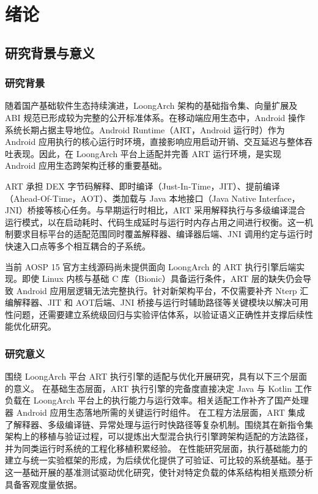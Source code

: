 \chapter{绪论}\label{chap:introduction}

\section{研究背景与意义}

\subsection{研究背景}

随着国产基础软件生态持续演进，LoongArch 架构的基础指令集、向量扩展及 ABI 规范已形成较为完整的公开标准体系\citep{LoongArchISA2023, LoongArchISAv2, LoongArchELFABI2025}。在移动端应用生态中，Android 操作系统长期占据主导地位\citep{StatCounter2025}。Android Runtime（ART，Android 运行时）作为 Android 应用执行的核心运行时环境，直接影响应用启动开销、交互延迟与整体吞吐表现。因此，在 LoongArch 平台上适配并完善 ART 运行环境，是实现 Android 应用生态跨架构迁移的重要基础。

ART 承担 DEX 字节码解释、即时编译（Just-In-Time，JIT）、提前编译（Ahead-Of-Time，AOT）、类加载与 Java 本地接口（Java Native Interface，JNI）桥接等核心任务\citep{AndroidRuntime2024, ArtJitCompiler2024, AospArtAndroid15R1}。与早期运行时相比，ART 采用解释执行与多级编译混合运行模式，以在启动耗时、代码生成延时与运行时内存占用之间进行权衡\citep{Paleczny2001, Suganuma2001}。这一机制要求目标平台的适配范围同时覆盖解释器、编译器后端、JNI 调用约定与运行时快速入口点等多个相互耦合的子系统。

当前 AOSP 15 官方主线源码尚未提供面向 LoongArch 的 ART 执行引擎后端实现\citep{AospArtAndroid15R1, AospArtMain2026}。即使 Linux 内核与基础 C 库（Bionic）具备运行条件，ART 层的缺失仍会导致 Android 应用层逻辑无法完整执行。针对新架构平台，不仅需要补齐 Nterp 汇编解释器、JIT 和 AOT后端、JNI 桥接与运行时辅助路径等关键模块以解决可用性问题，还需要建立系统级回归与实验评估体系，以验证语义正确性并支撑后续性能优化研究。

\subsection{研究意义}

围绕 LoongArch 平台 ART 执行引擎的适配与优化开展研究，具有以下三个层面的意义。
在基础生态层面，ART 执行引擎的完备度直接决定 Java 与 Kotlin 工作负载在 LoongArch 平台上的执行能力与运行效率。相关适配工作补齐了国产处理器 Android 应用生态落地所需的关键运行时组件。
在工程方法层面，ART 集成了解释器、多级编译链、异常处理与运行时快路径等复杂机制。围绕其在新指令集架构上的移植与验证过程，可以提炼出大型混合执行引擎跨架构适配的方法路径，并为同类运行时系统的工程化移植积累经验。
在性能研究层面，执行基础能力的建立与统一实验框架的形成，为后续优化提供了可验证、可比较的系统基础。基于这一基础开展的基准测试驱动优化研究，使针对特定负载的体系结构相关瓶颈分析具备客观度量依据。

